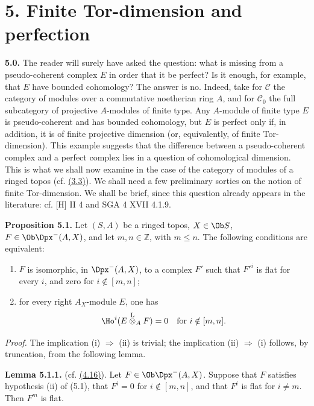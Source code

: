 \section*{5. Finite Tor-dimension and perfection}

\textbf{5.0.} The reader will surely have asked the question: what is missing from a pseudo-coherent complex \(E\) in order that it be perfect? Is it enough, for example, that \(E\) have bounded cohomology? The answer is no. Indeed, take for \(\mathcal C\) the category of modules over a commutative noetherian ring \(A\), and for \(\mathcal C_0\) the full subcategory of projective \(A\)-modules of finite type. Any \(A\)-module of finite type \(E\) is pseudo-coherent and has bounded cohomology, but \(E\) is perfect only if, in addition, it is of finite projective dimension (or, equivalently, of finite Tor-dimension). This example suggests that the difference between a pseudo-coherent complex and a perfect complex lies in a question of cohomological dimension. This is what we shall now examine in the case of the category of modules of a ringed topos (cf. \hyperlink{sga6.e01.lem.3-3}{(3.3)}). We shall need a few preliminary sorties on the notion of finite Tor-dimension. We shall be brief, since this question already appears in the literature: cf. [H] II 4 and SGA 4 XVII 4.1.9.

\textbf{Proposition 5.1.} Let \((S,A)\) be a ringed topos, \(X\in\Ob S\), \(F\in\Ob\Dpx^-(A,X)\), and let \(m,n\in\mathbb Z\), with \(m\leq n\). The following conditions are equivalent:
\begin{enumerate}[label=(\roman*)]
\item \(F\) is isomorphic, in \(\Dpx^-(A,X)\), to a complex \(F'\) such that \(F'^i\) is flat for every \(i\), and zero for \(i\notin[m,n]\);
\item for every right \(A_X\)-module \(E\), one has
\[
  \Ho^i(E\overset{\mathrm L}{\otimes}_A F)=0\quad\text{for }i\notin[m,n].
\]
\end{enumerate}

\emph{Proof.} The implication (i) \(\Rightarrow\) (ii) is trivial; the implication (ii) \(\Rightarrow\) (i) follows, by truncation, from the following lemma.

\textbf{Lemma 5.1.1.} (cf. \hyperlink{sga6.e01.lem.4-16}{(4.16)}). Let \(F\in\Ob\Dpx^-(A,X)\). Suppose that \(F\) satisfies hypothesis (ii) of (5.1), that \(F^i=0\) for \(i\notin[m,n]\), and that \(F^i\) is flat for \(i\ne m\). Then \(F^m\) is flat.

